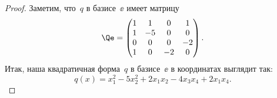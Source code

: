 \begin{proof}
	Заметим, что~$q$ в базисе~$\ee$ имеет матрицу
	\begin{equation}
		\label{eq:num_08:Qe}
		\Qe =
		\begin{pmatrix}
			1 & 1 & 0 & 1 \\
			1 & -5 & 0 & 0 \\
			0 & 0 & 0 & -2 \\
			1 & 0 & -2 & 0
		\end{pmatrix}
		.
	\end{equation}
	Итак, наша квадратичная форма~$q$ в базисе~$\ee$ в координатах выглядит так:
	\[
		q(x)
		=
		x_1^2 - 5x_2^2 + 2x_1 x_2 - 4 x_3 x_4 + 2x_1 x_4
		.
	\]


\end{proof}
